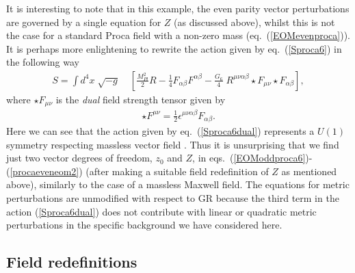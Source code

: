 \documentclass[10pt,twocolumn,preprintnumbers,amsmath,amssymb,nofootinbib
,superscriptaddress]{revtex4-1}
\begin{document}
{{{It is interesting to note that in this example, the even parity vector perturbations are governed by a single equation for $Z$ (as discussed above), whilst this is not the case for a standard Proca field with a non-zero mass (eq.~(\ref{EOMevenproca})). It is perhaps more enlightening to rewrite the action given by eq.~(\ref{Sproca6}) in the following way
\begin{align}
S=\int d^4x\;\sqrt{-g}&\;\left[\frac{M_{Pl}^2}{2}R-\frac{1}{4}F_{\alpha\beta}F^{\alpha\beta} -\frac{G_6}{4}\;R^{\mu\nu\alpha\beta}\star F_{\mu\nu}\star F_{\alpha\beta}\right],\label{Sproca6dual}
\end{align}
where $\star F_{\mu\nu}$ is the \textit{dual} field strength tensor given by
\begin{align}
\star F^{\mu\nu}=\frac{1}{2}\epsilon^{\mu\nu\alpha\beta}F_{\alpha\beta}.
\end{align}
Here we can see that the action given by eq.~(\ref{Sproca6dual}) represents a $U(1)$ symmetry respecting massless vector field \cite{2017JCAP...08..024H}. Thus it is unsurprising that we find just two vector degrees of freedom, $z_0$ and $Z$, in eqs.~(\ref{EOModdproca6})-(\ref{procaeveneom2}) (after making a suitable field redefinition of $Z$ as mentioned above), similarly to the case of a massless Maxwell field. The equations for metric perturbations are unmodified with respect to GR because the third term in the action (\ref{Sproca6dual}) does not contribute with linear or quadratic metric perturbations in the specific background we have considered here. 

\subsection{Field redefinitions}

}}}
\end{document}
